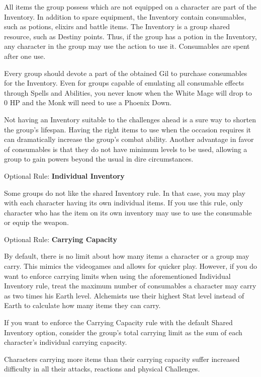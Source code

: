 \begin{multicols}{2}
All items the group possess which are not equipped on a character are part of the Inventory. In addition to spare equipment, the Inventory contain consumables, such as potions, elixirs and battle items. The Inventory is a group shared resource, such as Destiny points. Thus, if the group has a potion in the Inventory, any character in the group may use the  action to use it. Consumables are spent after one use.

Every group should devote a part of the obtained Gil to purchase consumables for the Inventory. Even for groups capable of emulating all consumable effects through Spells and Abilities, you never know when the White Mage will drop to 0 HP and the Monk will need to use a Phoenix Down.

Not having an Inventory suitable to the challenges ahead is a sure way to shorten the group's lifespan. Having the right items to use when the occasion requires it can dramatically increase the group’s combat ability. Another advantage in favor of consumables is that they do not have minimum levels to be used, allowing a group to gain powers beyond the usual in dire circumstances.

\begin{center}
\end{center}

\begin{boco}
Optional Rule: \textbf{Individual Inventory} \pc%

Some groups do not like the shared Inventory rule. In that case, you may play with each character having its own individual items. If you use this rule, only character who has the item on its own inventory may use  to use the consumable or equip the weapon. \pw%

Optional Rule: \textbf{Carrying Capacity} \pc%

By default, there is no limit about how many items a character or a group may carry. This mimics the videogames and allows for quicker play. However, if you do want to enforce carrying limits when using the aforementioned Individual Inventory rule, treat the maximum number of consumables a character may carry as two times his Earth level. Alchemists use their highest Stat level instead of Earth to calculate how many items they can carry. \pc%

If you want to enforce the Carrying Capacity rule with the default Shared Inventory option, consider the group's total carrying limit as the sum of each character's individual carrying capacity. \pc%

Characters carrying more items than their carrying capacity suffer increased difficulty in all their attacks, reactions and physical Challenges.

\end{boco}

\end{multicols}

